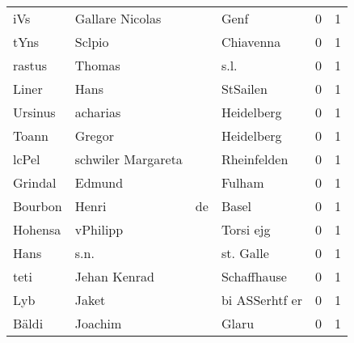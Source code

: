 \begin{tabular}{llllrr}
                      iVs &                    Gallare Nicolas &             &                                        Genf &          0 &         1 \\
                     tYns &                             Sclpio &             &                                   Chiavenna &          0 &         1 \\
                   rastus &                             Thomas &             &                                        s.l. &          0 &         1 \\
                    Liner &                               Hans &             &                                    StSailen &          0 &         1 \\
                  Ursinus &                           acharias &             &                                  Heidelberg &          0 &         1 \\
                    Toann &                             Gregor &             &                                  Heidelberg &          0 &         1 \\
                    lcPel &                 schwiler Margareta &             &                                 Rheinfelden &          0 &         1 \\
                  Grindal &                             Edmund &             &                                      Fulham &          0 &         1 \\
                  Bourbon &                              Henri &          de &                                       Basel &          0 &         1 \\
                  Hohensa &                           vPhilipp &             &                                   Torsi ejg &          0 &         1 \\
                     Hans &                               s.n. &             &                                   st. Galle &          0 &         1 \\
                     teti &                       Jehan Kenrad &             &                                 Schaffhause &          0 &         1 \\
                      Lyb &                              Jaket &             &                              bi ASSerhtf er &          0 &         1 \\
                    Bäldi &                            Joachim &             &                                       Glaru &          0 &         1 \\

\end{tabular}
